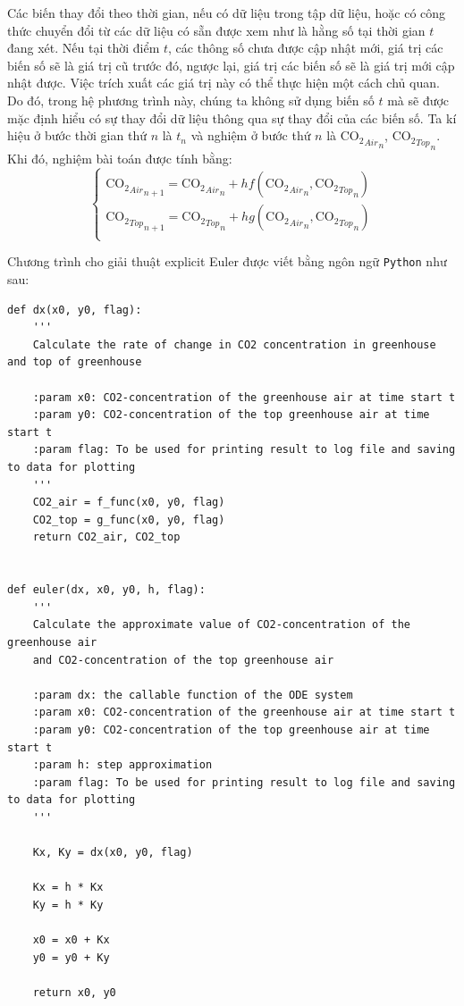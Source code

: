 \documentclass[a4paper]{article}
\begin{document}
Các biến thay đổi theo thời gian, nếu có dữ liệu trong tập dữ liệu, hoặc có công thức chuyển đổi từ các dữ liệu có sẵn được xem như là hằng số tại thời gian $t$ đang xét. Nếu tại thời điểm $t$, các thông số chưa được cập nhật mới, giá trị các biến số sẽ là giá trị cũ trước đó, ngược lại, giá trị các biến số sẽ là giá trị mới cập nhật được. Việc trích xuất các giá trị này có thể thực hiện một cách chủ quan. Do đó, trong hệ phương trình này, chúng ta không sử dụng biến số $t$ mà sẽ được mặc định hiểu có sự thay đổi dữ liệu thông qua sự thay đổi của các biến số. Ta kí hiệu ở bước thời gian thứ $n$ là $t_n$ và nghiệm ở bước thứ $n$ là ${\mathrm{CO_{2}}_{Air}}_n$, ${\mathrm{CO_{2}}_{Top}}_n$. Khi đó, nghiệm bài toán được tính bằng:
\begin{equation}\label{eq:102}
\begin{cases}
    {\mathrm{CO_{2}}_{Air}}_{n+1} = {\mathrm{CO_{2}}_{Air}}_{n} + hf({\mathrm{CO_{2}}_{Air}}_{n}, {\mathrm{CO_{2}}_{Top}}_{n}) \\
    {\mathrm{CO_{2}}_{Top}}_{n+1} = {\mathrm{CO_{2}}_{Top}}_{n} + hg({\mathrm{CO_{2}}_{Air}}_{n}, {\mathrm{CO_{2}}_{Top}}_{n}) \\
\end{cases}
\end{equation}

Chương trình cho giải thuật explicit Euler được viết bằng ngôn ngữ \texttt{Python} như sau:

\begin{verbatim}
def dx(x0, y0, flag):
    '''
    Calculate the rate of change in CO2 concentration in greenhouse and top of greenhouse

    :param x0: CO2-concentration of the greenhouse air at time start t
    :param y0: CO2-concentration of the top greenhouse air at time start t
    :param flag: To be used for printing result to log file and saving to data for plotting
    '''
    CO2_air = f_func(x0, y0, flag)
    CO2_top = g_func(x0, y0, flag)
    return CO2_air, CO2_top


def euler(dx, x0, y0, h, flag):
    '''
    Calculate the approximate value of CO2-concentration of the greenhouse air
    and CO2-concentration of the top greenhouse air

    :param dx: the callable function of the ODE system
    :param x0: CO2-concentration of the greenhouse air at time start t
    :param y0: CO2-concentration of the top greenhouse air at time start t
    :param h: step approximation
    :param flag: To be used for printing result to log file and saving to data for plotting
    '''

    Kx, Ky = dx(x0, y0, flag)

    Kx = h * Kx
    Ky = h * Ky

    x0 = x0 + Kx
    y0 = y0 + Ky

    return x0, y0
\end{verbatim}
\end{document}
